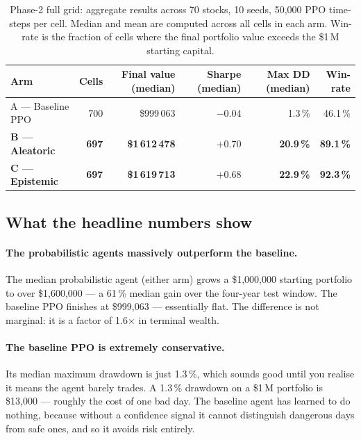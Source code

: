 \begin{table}[h]
\centering
\caption{Phase-2 full grid: aggregate results across 70 stocks, 10 seeds, 50,000 PPO time-steps per cell. Median and mean are computed across all cells in each arm. Win-rate is the fraction of cells where the final portfolio value exceeds the \$1\,M starting capital.}
\label{tab:phase2_headline}
\small
\begin{tabular}{lrrrrr}
\toprule
\textbf{Arm} & \textbf{Cells} & \textbf{Final value (median)} & \textbf{Sharpe (median)} & \textbf{Max DD (median)} & \textbf{Win-rate} \\
\midrule
A --- Baseline PPO & 700 & \$999\,063 & $-0.04$ & 1.3\,\% & 46.1\,\% \\
\textbf{B --- Aleatoric} & \textbf{697} & \textbf{\$1\,612\,478} & $\mathbf{+0.70}$ & \textbf{20.9\,\%} & \textbf{89.1\,\%} \\
\textbf{C --- Epistemic} & \textbf{697} & \textbf{\$1\,619\,713} & $\mathbf{+0.68}$ & \textbf{22.9\,\%} & \textbf{92.3\,\%} \\
\bottomrule
\end{tabular}
\end{table}

\subsection{What the headline numbers show}
\label{sec:phase2_what_headline_shows}

\paragraph{The probabilistic agents massively outperform the baseline.} The median probabilistic agent (either arm) grows a \$1,000,000 starting portfolio to over \$1,600,000 --- a 61\,\% median gain over the four-year test window. The baseline PPO finishes at \$999,063 --- essentially flat. The difference is not marginal: it is a factor of 1.6$\times$ in terminal wealth.

\paragraph{The baseline PPO is extremely conservative.} Its median maximum drawdown is just 1.3\,\%, which sounds good until you realise it means the agent barely trades. A 1.3\,\% drawdown on a \$1\,M portfolio is \$13,000 --- roughly the cost of one bad day. The baseline agent has learned to do nothing, because without a confidence signal it cannot distinguish dangerous days from safe ones, and so it avoids risk entirely.

